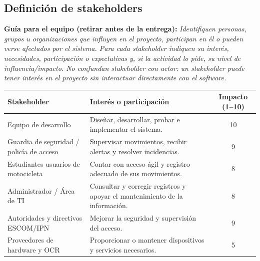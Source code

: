 \documentclass[12pt,letterpaper]{article}
\newcommand{\guia}[1]{\par\smallskip\noindent\textbf{Guía para el equipo (retirar antes de la entrega):} \textit{#1}\par\smallskip}
\begin{document}
\subsection{Definición de stakeholders}
\guia{Identifiquen personas, grupos u organizaciones que influyen en el proyecto, participan en él o pueden verse afectados por el sistema. Para cada stakeholder indiquen su interés, necesidades, participación o expectativas y, si la actividad lo pide, su nivel de influencia/impacto. No confundan stakeholder con actor: un stakeholder puede tener interés en el proyecto sin interactuar directamente con el software.}
\begin{tabularx}{\textwidth}{|p{3cm}|X|c|}
\hline Stakeholder & Interés o participación & Impacto (1--10) \\ \hline
Equipo de desarrollo & Diseñar, desarrollar, probar e implementar el sistema. & 10 \\ \hline
Guardia de seguridad / policía de acceso & Supervisar movimientos, recibir alertas y resolver incidencias. & 9 \\ \hline
Estudiantes usuarios de motocicleta & Contar con acceso ágil y registro adecuado de sus movimientos. & 8 \\ \hline
Administrador / Área de TI & Consultar y corregir registros y apoyar el mantenimiento de la información. & 8 \\ \hline
Autoridades y directivos ESCOM/IPN & Mejorar la seguridad y supervisión del acceso. & 9 \\ \hline
Proveedores de hardware y OCR & Proporcionar o mantener dispositivos y servicios necesarios. & 5 \\ \hline
\end{tabularx}
\end{document}
